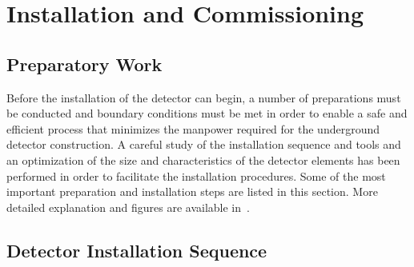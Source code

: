 \section{Installation and Commissioning}
\label{sec:detectors-fd-alt-install}

\subsection{Preparatory Work}

Before the installation of the detector can begin, a number of
preparations must be conducted and boundary conditions must be met in
order to enable a safe and efficient process that minimizes the
manpower required for the underground detector construction. A careful
study of the installation sequence and tools and an optimization of
the size and characteristics of the detector elements has been
performed in order to facilitate the installation procedures. Some of the
most important preparation and installation steps are listed in this
section. More detailed explanation and figures are available in~\cite{cdr-annex-lbno-2}.

\subsection{Detector Installation Sequence}

